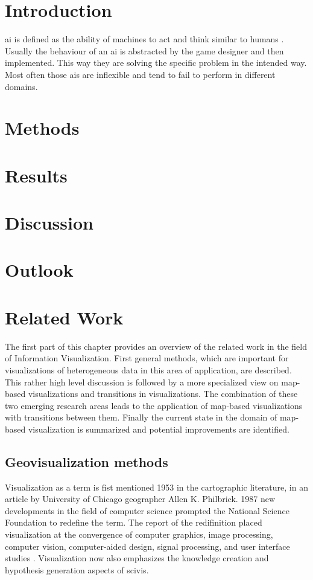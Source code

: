 \section{Introduction}

\bigskip

\ac{ai} is defined as the ability of machines to act and think similar to humans . Usually the behaviour of an \ac{ai} is abstracted by the game designer and then implemented. This way they are solving the specific problem in the intended way. Most often those \acp{ai} are inflexible and tend to fail to perform in different domains.

\section{Methods}

\section{Results}

\section{Discussion}

\section{Outlook}



\section{Related Work}
The first part of this chapter provides an overview of the related work in the field of
Information Visualization. First general methods, which are important for visualizations of heterogeneous data in this area of application, are described. This rather high level discussion is followed by a more specialized view on map-based visualizations and transitions in visualizations. The combination of these two emerging research areas leads to the application of map-based visualizations with transitions between them. Finally the current state in the domain of map-based visualization is summarized and potential improvements are identified.

\subsection{Geovisualization methods}
Visualization as a term is fist mentioned 1953 in the cartographic literature, in an article by University of Chicago geographer Allen K. Philbrick. 1987 new developments in the field of computer science prompted the National Science Foundation to redefine the term. The report of the redifinition placed visualization at the convergence of computer graphics, image processing, computer vision, computer-aided design, signal processing, and user interface studies . Visualization now also emphasizes the knowledge creation and hypothesis generation aspects of \ac{scivis}.

